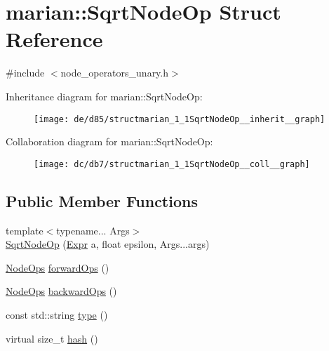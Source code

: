 \hypertarget{structmarian_1_1SqrtNodeOp}{}\section{marian\+:\+:Sqrt\+Node\+Op Struct Reference}
\label{structmarian_1_1SqrtNodeOp}


{\ttfamily \#include $<$node\+\_\+operators\+\_\+unary.\+h$>$}



Inheritance diagram for marian\+:\+:Sqrt\+Node\+Op\+:
\nopagebreak
\begin{figure}[H]
\begin{center}
\leavevmode
\texttt{[image: de/d85/structmarian\_1\_1SqrtNodeOp\_\_inherit\_\_graph]}
\end{center}
\end{figure}


Collaboration diagram for marian\+:\+:Sqrt\+Node\+Op\+:
\nopagebreak
\begin{figure}[H]
\begin{center}
\leavevmode
\texttt{[image: dc/db7/structmarian\_1\_1SqrtNodeOp\_\_coll\_\_graph]}
\end{center}
\end{figure}
\subsection*{Public Member Functions}
\begin{DoxyCompactItemize}
\item 
{\footnotesize template$<$typename... Args$>$ }\\\hyperlink{structmarian_1_1SqrtNodeOp_a1f7c8597145f1ae6e43e8a7fe3570a83}{Sqrt\+Node\+Op} (\hyperlink{namespacemarian_a498d8baf75b754011078b890b39c8e12}{Expr} a, float epsilon, Args...\+args)
\item 
\hyperlink{namespacemarian_a4956376218cc236016c20bc4071470da}{Node\+Ops} \hyperlink{structmarian_1_1SqrtNodeOp_aeefdf4eab958bdab2b4f8a70dcbc6c15}{forward\+Ops} ()
\item 
\hyperlink{namespacemarian_a4956376218cc236016c20bc4071470da}{Node\+Ops} \hyperlink{structmarian_1_1SqrtNodeOp_adeeaeffd66c0f516cc43b2f84b2a3240}{backward\+Ops} ()
\item 
const std\+::string \hyperlink{structmarian_1_1SqrtNodeOp_affe5bea1a901dd7b1a22dc0b974690cb}{type} ()
\item 
virtual size\+\_\+t \hyperlink{structmarian_1_1SqrtNodeOp_a83836f4ce180733221a17b5af8e2db58}{hash} ()
\end{DoxyCompactItemize}
